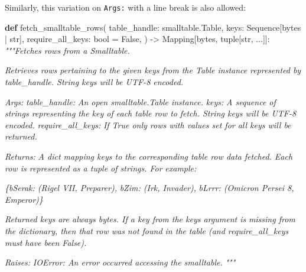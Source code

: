 \documentclass[
]{article}
\newenvironment{Shaded}{}{}
\newcommand{\BuiltInTok}[1]{\textcolor[rgb]{0.00,0.50,0.00}{#1}}
\newcommand{\CommentTok}[1]{\textcolor[rgb]{0.38,0.63,0.69}{\textit{#1}}}
\newcommand{\KeywordTok}[1]{\textcolor[rgb]{0.00,0.44,0.13}{\textbf{#1}}}
\newcommand{\NormalTok}[1]{#1}
\newcommand{\OperatorTok}[1]{\textcolor[rgb]{0.40,0.40,0.40}{#1}}
\newcommand{\VariableTok}[1]{\textcolor[rgb]{0.10,0.09,0.49}{#1}}
\begin{document}
\clearpage
Similarly, this variation on \texttt{Args:} with a line break is also
allowed:

\begin{samepage}
\begin{Shaded}
\begin{Highlighting}[]
\KeywordTok{def}\NormalTok{ fetch\_smalltable\_rows(}
\NormalTok{    table\_handle: smalltable.Table,}
\NormalTok{    keys: Sequence[}\BuiltInTok{bytes} \OperatorTok{|} \BuiltInTok{str}\NormalTok{],}
\NormalTok{    require\_all\_keys: }\BuiltInTok{bool} \OperatorTok{=} \VariableTok{False}\NormalTok{,}
\NormalTok{) }\OperatorTok{{-}\textgreater{}}\NormalTok{ Mapping[}\BuiltInTok{bytes}\NormalTok{, }\BuiltInTok{tuple}\NormalTok{[}\BuiltInTok{str}\NormalTok{, ...]]:}
    \CommentTok{"""Fetches rows from a Smalltable.}

\CommentTok{    Retrieves rows pertaining to the given keys from the Table instance}
\CommentTok{    represented by table\_handle.  String keys will be UTF{-}8 encoded.}

\CommentTok{    Args:}
\CommentTok{      table\_handle:}
\CommentTok{        An open smalltable.Table instance.}
\CommentTok{      keys:}
\CommentTok{        A sequence of strings representing the key of each table row to}
\CommentTok{        fetch.  String keys will be UTF{-}8 encoded.}
\CommentTok{      require\_all\_keys:}
\CommentTok{        If True only rows with values set for all keys will be returned.}

\CommentTok{    Returns:}
\CommentTok{      A dict mapping keys to the corresponding table row data}
\CommentTok{      fetched. Each row is represented as a tuple of strings. For}
\CommentTok{      example:}

\CommentTok{      \{b\textquotesingle{}Serak\textquotesingle{}: (\textquotesingle{}Rigel VII\textquotesingle{}, \textquotesingle{}Preparer\textquotesingle{}),}
\CommentTok{       b\textquotesingle{}Zim\textquotesingle{}: (\textquotesingle{}Irk\textquotesingle{}, \textquotesingle{}Invader\textquotesingle{}),}
\CommentTok{       b\textquotesingle{}Lrrr\textquotesingle{}: (\textquotesingle{}Omicron Persei 8\textquotesingle{}, \textquotesingle{}Emperor\textquotesingle{})\}}

\CommentTok{      Returned keys are always bytes.  If a key from the keys argument is}
\CommentTok{      missing from the dictionary, then that row was not found in the}
\CommentTok{      table (and require\_all\_keys must have been False).}

\CommentTok{    Raises:}
\CommentTok{      IOError: An error occurred accessing the smalltable.}
\CommentTok{    """}
\end{Highlighting}
\end{Shaded}
\end{samepage}
\end{document}
